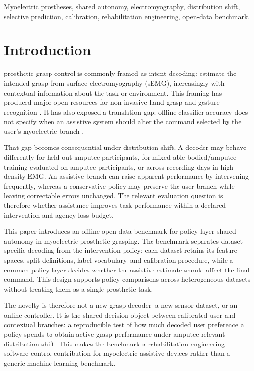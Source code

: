 \documentclass[journal]{IEEEtran}
\begin{document}
\begin{IEEEkeywords}
Myoelectric prostheses, shared autonomy, electromyography, distribution shift, selective prediction, calibration, rehabilitation engineering, open-data benchmark.
\end{IEEEkeywords}

\section{Introduction}
 prosthetic grasp control is commonly framed as intent decoding: estimate the intended grasp from surface electromyography (sEMG), increasingly with contextual information about the task or environment. This framing has produced major open resources for non-invasive hand-grasp and gesture recognition \cite{Atzori2014Ninapro,Cognolato2020MeganePro,Jiang2021Hyser,Jiang2023HyserPhysioNet,Yang2025CEMHSEY,Pradhan2022GRABMyo,Jiang2024GRABMyoPhysioNet}. It has also exposed a translation gap: offline classifier accuracy does not specify when an assistive system should alter the command selected by the user's myoelectric branch \cite{Jiang2012Focus,Scheme2011Selective}.

That gap becomes consequential under distribution shift. A decoder may behave differently for held-out amputee participants, for mixed able-bodied/amputee training evaluated on amputee participants, or across recording days in high-density EMG. An assistive branch can raise apparent performance by intervening frequently, whereas a conservative policy may preserve the user branch while leaving correctable errors unchanged. The relevant evaluation question is therefore whether assistance improves task performance within a declared intervention and agency-loss budget.

This paper introduces an offline open-data benchmark for policy-layer shared autonomy in myoelectric prosthetic grasping. The benchmark separates dataset-specific decoding from the intervention policy: each dataset retains its feature spaces, split definitions, label vocabulary, and calibration procedure, while a common policy layer decides whether the assistive estimate should affect the final command. This design supports policy comparisons across heterogeneous datasets without treating them as a single prosthetic task.

The novelty is therefore not a new grasp decoder, a new sensor dataset, or an online controller. It is the shared decision object between calibrated user and contextual branches: a reproducible test of how much decoded user preference a policy spends to obtain active-grasp performance under amputee-relevant distribution shift. This makes the benchmark a rehabilitation-engineering software-control contribution for myoelectric assistive devices rather than a generic machine-learning benchmark.
\end{document}
